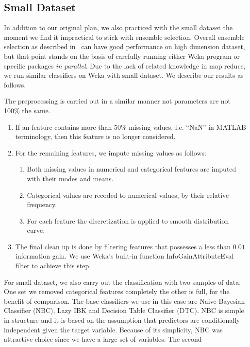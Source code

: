 \documentclass[journal]{IEEEtran}
\begin{document}
\subsection{Small Dataset}
\label{sec:small-dataset}
In addition to our original plan, we also practiced with the small
dataset the moment we find it impractical to stick with ensemble
selection. Overall ensemble selection as described
in~\cite{Caruana:2008:EES:1390156.1390169} can have good performance
on high dimension dataset, but that point stands on the basis of
carefully running either Weka program or specific packages \emph{in
  parallel}. Due to the lack of related knowledge in map reduce, we
run similar classifiers on Weka with small dataset. We describe our
results as follows.
\par
The preprocessing is carried out in a similar manner not parameters
are not 100\% the same.
\begin{enumerate}
\item If an feature contains more than 50\% missing values,
  i.e. ``NaN'' in MATLAB terminology, then this feature is no longer
  considered. 
\item For the remaining features, we impute missing values as follows:
  \begin{enumerate}
  \item Both missing values in numerical and categorical features are
    imputed with their modes and means.
  \item Categorical values are recoded to numerical values, by their
    relative frequency.
  \item For each feature the discretization is applied to smooth
    distribution curve.
  \end{enumerate}
\item The final clean up is done by filtering features that possesses
  a less than $0.01$ information gain. We use Weka's built-in function
  InfoGainAttributeEval filter to achieve this step.
\end{enumerate}
For small dataset, we also carry out the classification with two
samples of data. One set we removed categorical features completely
the other is full, for the benefit of comparison. The base classifiers
we use in this case are Naive Bayesian Classifier (NBC), Lazy IBK and
Decision Table Classifier (DTC). NBC is simple in structure and it is
based on the assumption that predictors are conditionally independent
given the target variable. Because of its simplicity, NBC was
attractive choice since we have a large set of variables.  The second
\end{document}
